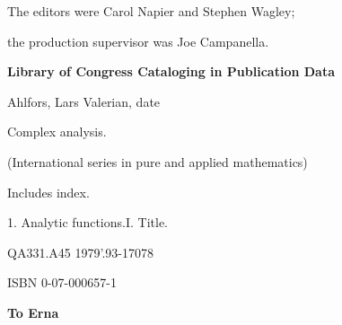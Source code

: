 The editors were Carol Napier and Stephen Wagley;\par
the production supervisor was Joe Campanella.\par
\bigskip\bigskip
\textbf{Library of Congress Cataloging in Publication Data}\par\medskip
Ahlfors, Lars Valerian, date\par
\hspace{1em}Complex analysis.\par\medskip
\hspace{1em}(International series in pure and applied mathematics)\par
\hspace{1em}Includes index.\par
\hspace{1em}1. Analytic functions.\quad I. Title.\par
QA331.A45 1979'.93-17078\par
ISBN 0-07-000657-1
\endgroup
\clearpage
\thispagestyle{empty}
\null\vspace{3em}
\begin{flushright}\sffamily\bfseries To Erna\end{flushright}
\clearpage
\pagestyle{fancy}
